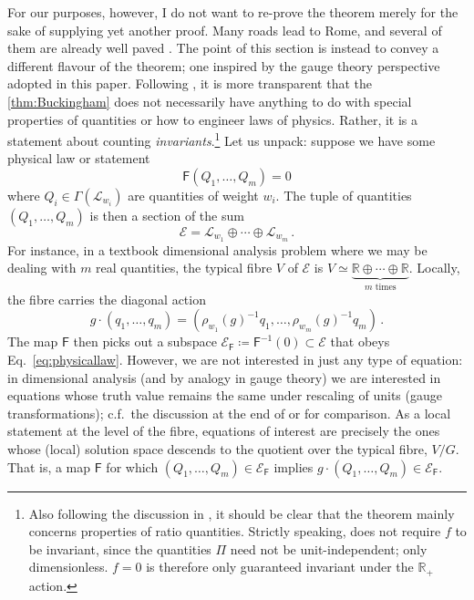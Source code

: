 \documentclass[12pt]{article}
\numberwithin{equation}{section}
\newcommand{\R}{\mathbb{R}}
\begin{document}
For our purposes, however, I do not want to re-prove the theorem merely for the sake of supplying yet another proof. Many roads lead to Rome, and several of them are already well paved \citep{Ehrenfest1916, Gibbings1982, Gibbings2011}. The point of this section is instead to convey a different flavour of the theorem; one inspired by the gauge theory perspective adopted in this paper. Following , it is more transparent that the \cref{thm:Buckingham} does not necessarily have anything to do with special properties of quantities or how to engineer laws of physics. Rather, it is a statement about counting \emph{invariants}.\footnote{Also following the discussion in , it should be clear that the theorem mainly concerns properties of ratio quantities. Strictly speaking,  does not require $f$ to be invariant, since the quantities $\Pi$ need not be unit-independent; only dimensionless. $f=0$ is therefore only guaranteed invariant under the $\mathbb{R}_+$ action.} Let us unpack: suppose we have some physical law or statement
\begin{equation}\label{eq:physicallaw}
    \mathsf{F}(Q_1,\dots,Q_m)=0
\end{equation}
where $Q_i\in \Gamma(\mathcal{L}_{w_i})$ are quantities of weight $w_i$. The tuple of quantities $(Q_1,\dots,Q_m)$ is then a section of the sum
\begin{equation}
    \mathcal{E}=\mathcal{L}_{w_1}\oplus \cdots \oplus \mathcal{L}_{w_m}\,.
\end{equation}
For instance, in a textbook dimensional analysis problem where we may be dealing with $m$ real quantities, the typical fibre $V$ of $\mathcal{E}$ is $V\simeq \underbrace{\R\oplus \cdots \oplus \R}_{\text{$m$ times}}$. Locally, the fibre carries the diagonal action
\begin{equation}
    g\cdot (q_1,\dots,q_m)=(\rho_{w_1}(g)^{-1}q_1,\dots,\rho_{w_m}(g)^{-1}q_m)\,.
\end{equation}
The map $\mathsf{F}$ then picks out a subspace $\mathcal{E}_\mathsf{F}\coloneqq \mathsf{F}^{-1}(0)\subset \mathcal{E}$ that obeys Eq.~\eqref{eq:physicallaw}. However, we are not interested in just any type of equation: in dimensional analysis (and by analogy in gauge theory) we are interested in equations whose truth value remains the same under rescaling of units (gauge transformations); c.f.~the discussion at the end of  or  for comparison. As a local statement at the level of the fibre, equations of interest are precisely the ones whose (local) solution space descends to the quotient over the typical fibre, $V/G$. That is, a map $\mathsf{F}$ for which $(Q_1,\dots,Q_m)\in \mathcal{E}_\mathsf{F}$ implies $g\cdot(Q_1,\dots,Q_m)\in \mathcal{E}_\mathsf{F}$. 
\end{document}
